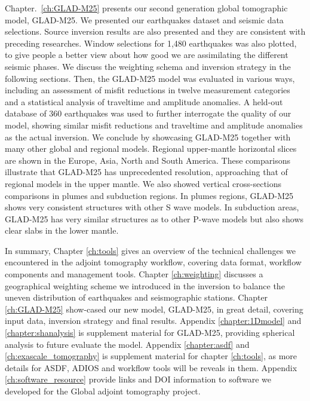 Chapter.~\ref{ch:GLAD-M25} presents our second generation global tomographic model, GLAD-M25.
We presented our earthquakes dataset and seismic data selections. Source inversion
results are also presented and they are consistent with preceding researches.
Window selections for 1,480 earthquakes was also plotted, to give people a better
view about how good we are assimilating the different seismic phases.
We discuss the weighting schema and inversion strategy in the following sections.
Then, the GLAD-M25 model was evaluated in various ways, including an assessment of misfit reductions
in twelve measurement categories and
a statistical analysis of traveltime and amplitude anomalies.
A held-out database of 360 earthquakes was used to further interrogate the quality of our model,
showing similar misfit reductions and traveltime and amplitude anomalies as the actual inversion.
We conclude by showcasing GLAD-M25 together with many other global and regional models.
Regional upper-mantle horizontal slices are shown in the Europe, Asia, North and South America.
These comparisons illustrate that GLAD-M25 has unprecedented resolution, approaching that of regional models
in the upper mantle. We also showed vertical cross-sections comparisons in plumes and subduction regions.
In plumes regions, GLAD-M25 shows very consistent structures with other S wave models. In subduction
areas, GLAD-M25 has very similar structures as to other P-wave models but also shows clear slabs 
in the lower mantle.

In summary, Chapter \ref{ch:tools} gives an overview of the technical challenges we encountered
in the adjoint tomography workflow, covering data format, workflow components and management tools.
Chapter \ref{ch:weighting} discusses a geographical weighting scheme we introduced
in the inversion to balance the uneven distribution of earthquakes and seismographic stations.
Chapter \ref{ch:GLAD-M25} show-cased our new model, GLAD-M25, in great detail, covering input data,
inversion strategy and final results.
Appendix \ref{chapter:1Dmodel} and \ref{chapter:shanalysis} is supplement material for GLAD-M25,
providing spherical analysis to future evaluate the model. Appendix \ref{chapter:asdf} and
\ref{ch:exascale_tomography} is supplement material for chapter \ref{ch:tools}, as more details
for ASDF, ADIOS and workflow tools will be reveals in them. Appendix \ref{ch:software_resource}
provide links and DOI information to software we developed for the Global adjoint tomography project.